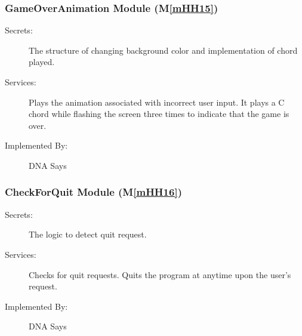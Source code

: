 \documentclass[12pt, titlepage]{article}
\newcommand{\mref}[1]{M\ref{#1}}
\begin{document}
\subsubsection{GameOverAnimation Module (\mref{mHH15})}
\begin{description}
\item[Secrets:]The structure of changing background color and implementation of chord played.
\item[Services:]Plays the animation associated with incorrect user input. It plays a C chord while flashing the screen three times to indicate that the game is over.
\item[Implemented By:] DNA Says
\end{description}

\subsubsection{CheckForQuit Module (\mref{mHH16})}
\begin{description}
\item[Secrets:]The logic to detect quit request.
\item[Services:]Checks for quit requests. Quits the program at anytime upon the user's request.
\item[Implemented By:] DNA Says
\end{description}
\end{document}
